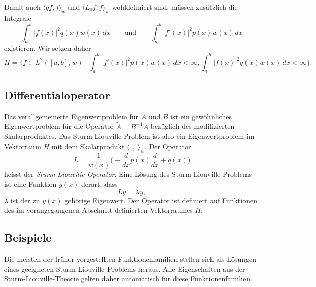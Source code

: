 Damit auch $\langle qf,f\rangle_w$ und $\langle L_0f,f\rangle_w$
wohldefiniert sind, müssen zusätzlich die Integrale
\[
\int_a^b |f(x)|^2 q(x) w(x)\,dx
\qquad\text{und}\qquad
\int_a^b |f'(x)|^2 p(x) w(x)\,dx
\]
existieren.
Wir setzen daher
\[
H
=
\biggl\{
f\in L^2([a,b],w)\;\bigg|\;
\int_a^b |f'(x)|^2p(x)w(x)\,dx<\infty,
\int_a^b |f(x)|^2q(x)w(x)\,dx<\infty
\biggr\}.
\]

\subsection{Differentialoperator}
Das verallgemeinerte Eigenwertproblem für $A$ und $B$ ist ein
gewöhnliches Eigenwertproblem für die Operator $\tilde{A}=B^{-1}A$
bezüglich des modifizierten Skalarproduktes.
Das Sturm-Liouville-Problem ist also ein Eigenwertproblem im
Vektorraum $H$ mit dem Skalarprodukt $\langle\,\;,\;\rangle_w$.
Der Operator
\[
L = \frac{1}{w(x)} \biggl(-\frac{d}{dx} p(x)\frac{d}{dx} + q(x)\biggr)
\]
heisst der {\em Sturm-Liouville-Operator}.
Eine Lösung des Sturm-Liouville-Problems ist eine Funktion $y(x)$ derart,
dass 
\[
Ly = \lambda y,
\]
$\lambda$ ist der zu $y(x)$ gehörige Eigenwert.
Der Operator ist definiert auf Funktionen des im vorangegangenen Abschnitt
definierten Vektorraumes $H$.

\subsection{Beispiele}
Die meisten der früher vorgestellten Funktionenfamilien stellen sich
als Lösungen eines geeigneten Sturm-Liouville-Problems heraus.
Alle Eigenschaften aus der Sturm-Liouville-Theorie gelten daher
automatisch für diese Funktionenfamilien.

